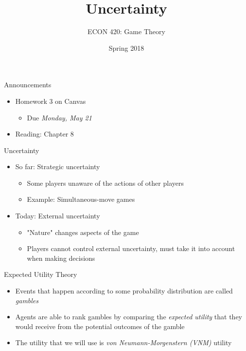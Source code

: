 \documentclass[10pt]{beamer}
\author{ECON 420: Game Theory}
\date{Spring 2018}
\title{Uncertainty}
\begin{document}
\maketitle

\begin{frame}[label={sec:org282533e}]{}
\alert{Announcements} 
\begin{itemize}
\item Homework 3 on Canvas 
\begin{itemize}
\item Due \emph{Monday, May 21}
\end{itemize}
\item Reading: Chapter 8
\end{itemize}
\end{frame}

\begin{frame}[label={sec:org6f426f7}]{}
\alert{Uncertainty}
\begin{itemize}
\item So far: Strategic uncertainty
\begin{itemize}
\item Some players unaware of the actions of other players
\item Example: Simultaneous-move games
\end{itemize}
\item Today: External uncertainty
\begin{itemize}
\item "Nature" changes aspects of the game
\item Players cannot control external uncertainty, must take it into account when making decisions
\end{itemize}
\end{itemize}
\end{frame}

\begin{frame}[label={sec:org79d087b}]{}
\alert{Expected Utility Theory}
\begin{itemize}
\item Events that happen according to some probability distribution are called \emph{gambles}
\item Agents are able to rank gambles by comparing the \emph{expected utility} that they would receive from the potential outcomes of the gamble
\item The utility that we will use is \emph{von Neumann-Morgenstern (VNM)} utility
\end{itemize}
\end{frame}
\end{document}
